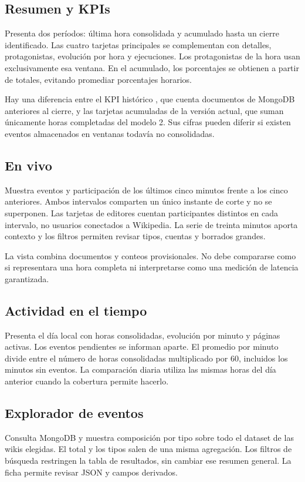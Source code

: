 \subsection{Resumen y KPIs}
Presenta dos períodos: última hora consolidada y acumulado hasta un cierre identificado. Las cuatro tarjetas principales se complementan con detalles, protagonistas, evolución por hora y ejecuciones. Los protagonistas de la hora usan exclusivamente esa ventana. En el acumulado, los porcentajes se obtienen a partir de totales, evitando promediar porcentajes horarios.

Hay una diferencia entre el KPI histórico , que cuenta documentos de MongoDB anteriores al cierre, y las tarjetas acumuladas de la versión actual, que suman únicamente horas completadas del modelo 2. Sus cifras pueden diferir si existen eventos almacenados en ventanas todavía no consolidadas.

\subsection{En vivo}
Muestra eventos y participación de los últimos cinco minutos frente a los cinco anteriores. Ambos intervalos comparten un único instante de corte y no se superponen. Las tarjetas de editores cuentan participantes distintos en cada intervalo, no usuarios conectados a Wikipedia. La serie de treinta minutos aporta contexto y los filtros permiten revisar tipos, cuentas y borrados grandes.

La vista combina documentos y conteos provisionales. No debe compararse como si representara una hora completa ni interpretarse como una medición de latencia garantizada.

\subsection{Actividad en el tiempo}
Presenta el día local con horas consolidadas, evolución por minuto y páginas activas. Los eventos pendientes se informan aparte. El promedio por minuto divide entre el número de horas consolidadas multiplicado por 60, incluidos los minutos sin eventos. La comparación diaria utiliza las mismas horas del día anterior cuando la cobertura permite hacerlo.

\subsection{Explorador de eventos}
Consulta MongoDB y muestra composición por tipo sobre todo el dataset de las wikis elegidas. El total y los tipos salen de una misma agregación. Los filtros de búsqueda restringen la tabla de resultados, sin cambiar ese resumen general. La ficha permite revisar JSON y campos derivados.

